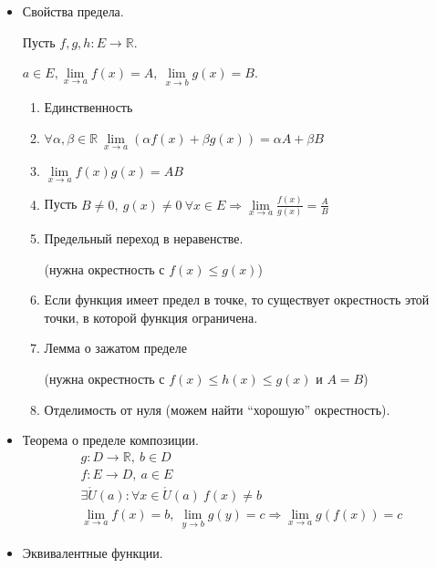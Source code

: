 \documentclass[14pt]{extarticle}
\numberwithin{equation}{section}
\newcommand{\RR}{\mathbb{R}}
\begin{document}
    \begin{itemize}
        \item
            Свойства предела.

            Пусть \( f, g, h : E \to \RR \).

            \( a \in E, \lim\limits_{x \to a} f(x) = A, \ \lim\limits_{x \to b} g(x) = B \).

            \begin{enumerate}
                \item
                    Единственность
                \item
                    \( \forall \alpha, \beta \in \RR \ \lim\limits_{x \to a} (\alpha f(x) + \beta g(x)) = \alpha A + \beta B \)
                \item
                    \( \lim\limits_{x \to a} f(x)g(x) = AB \)
                \item
                    Пусть
                    \(
                        B \neq 0, \ g(x) \neq 0 \ \forall x \in E \Rightarrow \lim\limits_{x \to a} \frac{f(x)}{g(x)} = \frac{A}{B}
                    \)
                \item
                    Предельный переход в неравенстве.

                    (нужна окрестность с \( f(x) \leq g(x) \))
                \item
                    Если функция имеет предел в точке, то существует окрестность этой точки, в которой функция ограничена.
                \item
                    Лемма о зажатом пределе

                    (нужна окрестность с \( f(x) \leq h(x) \leq g(x)\) и \( A = B \))
                \item
                    Отделимость от нуля (можем найти ``хорошую'' окрестность).
            \end{enumerate}
        \item
            Теорема о пределе композиции.
            \begin{gather*}
                g : D \to \RR, \ b \in D
                \\
                f : E \to D, \ a \in E
                \\
                \exists \mathring{U}(a) : \forall x \in \mathring{U}(a) \ f(x) \neq b
                \\
                \lim\limits_{x \to a} f(x) = b, \ \lim\limits_{y \to b} g(y) = c \Rightarrow \lim\limits_{x \to a} g(f(x)) = c
            \end{gather*}
        \item
            Эквивалентные функции.


\end{itemize}
\end{document}
